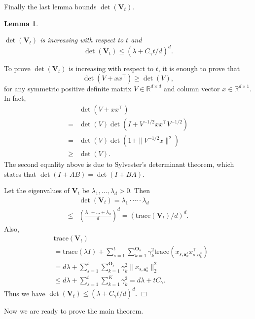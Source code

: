 \documentclass{article}
\newcommand{\RR}{\mathbb{R}}
\newcommand{\ba}{\mathbf{a}}
\newcommand{\bO}{\mathbf{O}}
\newcommand{\bV}{\mathbf{V}}
\newcommand{\trace}{\mathrm{trace}}
\newcommand{\norm}[1]{\| #1 \|}
\newtheorem{lemma}[theorem]{Lemma}%
\newenvironment{proof}{\noindent {\textbf{Proof. }}}{$\Box$ \medskip}
\newcommand{\CLemmaDetVt}{
  $\det(\bV_t)$ is increasing with respect to $t$ and 
  $$
    \det(\bV_t) \leq (\lambda + C_\gamma t/d)^d.
  $$
}
\begin{document}
Finally the last lemma bounds $\det(\bV_t)$.

\begin{lemma} %
	\label{lem:detVt}
	\CLemmaDetVt
\end{lemma}
\begin{proof}
	To prove $\det(\bV_t)$ is increasing with respect to $t$, it is enough to prove that
	$$
	\det(V + xx^{\top}) \geq \det(V),
	$$
	for any symmetric positive definite matrix $V \in \RR^{d \times d}$ and column vector $x \in \RR^{d\times 1}$. In fact,
	\begin{align*}
	&\det(V + xx^{\top}) \\
	=& \det(V) \det(I + V^{-1/2}x x^{\top} V^{-1/2})\\
	=& \det(V) \det(1 + \norm{V^{-1/2}x}^2)\\
	\geq &\det(V).
	\end{align*}
	The second equality above is due to Sylvester's determinant theorem, which states that $\det(I + AB) = \det(I +BA)$.
	
	Let the eigenvalues of $\bV_t$ be $\lambda_1, \ldots, \lambda_d > 0$. Then
	\begin{align*}
	&\det(\bV_t) = \lambda_1 \cdot \cdots \cdot \lambda_d \\
	\leq & \left( \frac{\lambda_1 + \ldots + \lambda_d}{d} \right)^d = (\trace(\bV_t)/d)^d.
	\end{align*}
	Also,
	\begin{align*}
	&\trace(\bV_t)\\
	& = \trace(\lambda I) + \sum_{s=1}^t \sum_{k=1}^{\bO_s} \gamma_k^2 \trace(x_{s,\ba_k^s} x_{s,\ba_k^s}^{\top})\\	
	& = d \lambda + \sum_{s=1}^t \sum_{k=1}^{\bO_s} \gamma_k^2 \norm{x_{s,\ba_k^s}}_2^2\\
	& \leq d \lambda + \sum_{s=1}^t\sum_{k=1}^{K}\gamma_k^2 = d \lambda + t C_\gamma.
	\end{align*}
	Thus we have $\det(\bV_t) \leq (\lambda + C_\gamma t/d)^d.$
\end{proof}

Now we are ready to prove the main theorem.
\end{document}
